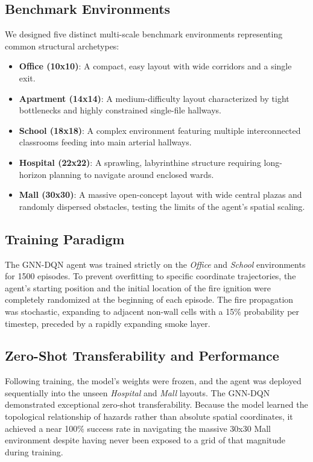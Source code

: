 \documentclass[conference]{IEEEtran}
\begin{document}
\subsection{Benchmark Environments}
We designed five distinct multi-scale benchmark environments representing common structural archetypes:
\begin{itemize}
    \item \textbf{Office (10x10)}: A compact, easy layout with wide corridors and a single exit.
    \item \textbf{Apartment (14x14)}: A medium-difficulty layout characterized by tight bottlenecks and highly constrained single-file hallways.
    \item \textbf{School (18x18)}: A complex environment featuring multiple interconnected classrooms feeding into main arterial hallways.
    \item \textbf{Hospital (22x22)}: A sprawling, labyrinthine structure requiring long-horizon planning to navigate around enclosed wards.
    \item \textbf{Mall (30x30)}: A massive open-concept layout with wide central plazas and randomly dispersed obstacles, testing the limits of the agent's spatial scaling.
\end{itemize}

\subsection{Training Paradigm}
The GNN-DQN agent was trained strictly on the \textit{Office} and \textit{School} environments for 1500 episodes. To prevent overfitting to specific coordinate trajectories, the agent's starting position and the initial location of the fire ignition were completely randomized at the beginning of each episode. The fire propagation was stochastic, expanding to adjacent non-wall cells with a 15\% probability per timestep, preceded by a rapidly expanding smoke layer.

\subsection{Zero-Shot Transferability and Performance}
Following training, the model's weights were frozen, and the agent was deployed sequentially into the unseen \textit{Hospital} and \textit{Mall} layouts. The GNN-DQN demonstrated exceptional zero-shot transferability. Because the model learned the topological relationship of hazards rather than absolute spatial coordinates, it achieved a near 100\% success rate in navigating the massive 30x30 Mall environment despite having never been exposed to a grid of that magnitude during training.
\end{document}

